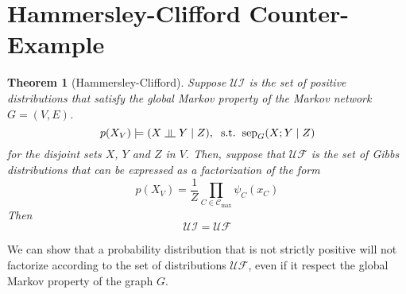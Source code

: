 \documentclass{article}
\numberwithin{equation}{section}
\newcommand{\s}{\hspace{0.1cm}}
\newcommand{\indep}{\s \rotatebox[origin=c]{90}{$\models$}\s }
\theoremstyle{named}
\newtheorem*{namedtheorem}{Theorem}
\begin{document}
\section{Hammersley-Clifford Counter-Example}
\begin{namedtheorem}[Hammersley-Clifford]
Suppose $\mathcal{UI}$ is the set of positive distributions that satisfy the global Markov 
property of the Markov network $G = (V, E)$. 
\[
        p(X_V) \models (X \indep Y \mid Z),\s\s \text{s.t.}\s\s \text{sep}_G(X ;Y \mid Z)
\]
for the disjoint sets $X$, $Y$ and $Z$ in $V$.
Then, suppose that  
 $\mathcal{UF}$ is the set of Gibbs distributions that can be expressed as a factorization 
of the form 
\[
        p(X_V) = \frac{1}{Z} \prod_{C \in \mathscr{C}_{\max}} \psi_C(x_C)
\]
Then
\[
        \mathcal{UI} = \mathcal{UF}
\]
\end{namedtheorem}

We can show that a probability distribution that is not strictly positive 
will not factorize according to the set of distributions $\mathcal{UF}$, 
even if it respect 
the global Markov property of the graph $G$.
\end{document}
